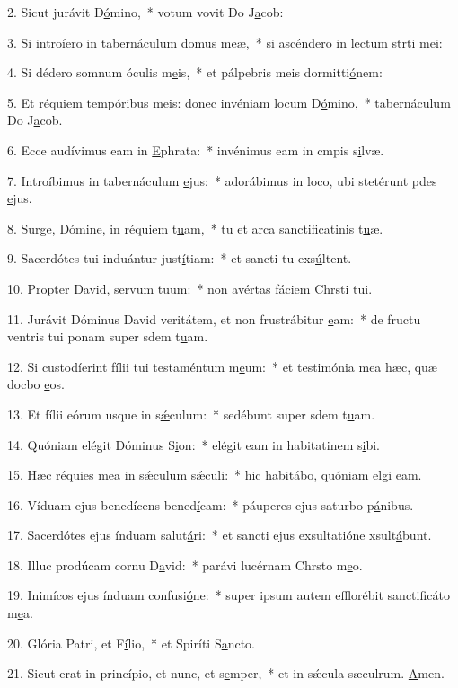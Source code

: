 2. Sicut jurávit D\uline{ó}mino,~* votum vovit Do J\uline{a}cob:\par 
3. Si introíero in tabernáculum domus m\uline{e}æ,~* si ascéndero in lectum strti m\uline{e}i:\par 
4. Si dédero somnum óculis m\uline{e}is,~* et pálpebris meis dormitti\uline{ó}nem:\par 
5. Et réquiem tempóribus meis: donec invéniam locum D\uline{ó}mino,~* tabernáculum Do J\uline{a}cob.\par 
6. Ecce audívimus eam in \uline{E}phrata:~* invénimus eam in cmpis s\uline{i}lvæ.\par 
7. Introíbimus in tabernáculum \uline{e}jus:~* adorábimus in loco, ubi stetérunt pdes \uline{e}jus.\par 
8. Surge, Dómine, in réquiem t\uline{u}am,~* tu et arca sanctificatinis t\uline{u}æ.\par 
9. Sacerdótes tui induántur just\uline{í}tiam:~* et sancti tu exs\uline{ú}ltent.\par 
10. Propter David, servum t\uline{u}um:~* non avértas fáciem Chrsti t\uline{u}i.\par 
11. Jurávit Dóminus David veritátem, et non frustrábitur \uline{e}am:~* de fructu ventris tui ponam super sdem t\uline{u}am.\par 
12. Si custodíerint fílii tui testaméntum m\uline{e}um:~* et testimónia mea hæc, quæ docbo \uline{e}os.\par 
13. Et fílii eórum usque in s\uline{ǽ}culum:~* sedébunt super sdem t\uline{u}am.\par 
14. Quóniam elégit Dóminus S\uline{i}on:~* elégit eam in habitatinem s\uline{i}bi.\par 
15. Hæc réquies mea in sǽculum s\uline{ǽ}culi:~* hic habitábo, quóniam elgi \uline{e}am.\par 
16. Víduam ejus benedícens bened\uline{í}cam:~* páuperes ejus saturbo p\uline{á}nibus.\par 
17. Sacerdótes ejus índuam salut\uline{á}ri:~* et sancti ejus exsultatióne xsult\uline{á}bunt.\par 
18. Illuc prodúcam cornu D\uline{a}vid:~* parávi lucérnam Chrsto m\uline{e}o.\par 
19. Inimícos ejus índuam confusi\uline{ó}ne:~* super ipsum autem efflorébit sanctificáto m\uline{e}a.\par 
20. Glória Patri, et F\uline{í}lio,~* et Spiríti S\uline{a}ncto.\par 
21. Sicut erat in princípio, et nunc, et s\uline{e}mper,~* et in sǽcula sæculrum. \uline{A}men.\par 
